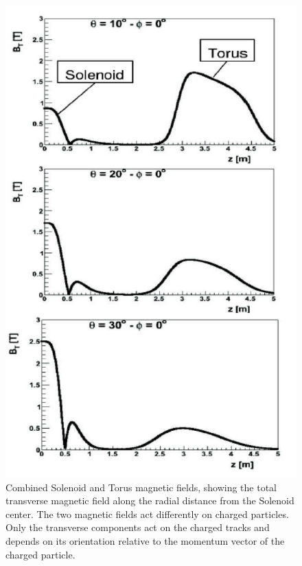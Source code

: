 \documentclass[final,3p,times,twocolumn,authoryear]{elsarticle}
\begin{document}
 
\begin{figure}[htbp!]
\centerline{\includegraphics[width=1.0\columnwidth]{magfield.png}}
\caption{\footnotesize Combined Solenoid and Torus magnetic fields, showing the total transverse magnetic field along 
the radial distance from the Solenoid center. The two magnetic fields act differently on charged particles.
Only the transverse components act on the charged tracks and depends on its orientation relative to the 
momentum vector of the charged particle. 
}
\label{solenoid-torus}
\end{figure}
\end{document}
